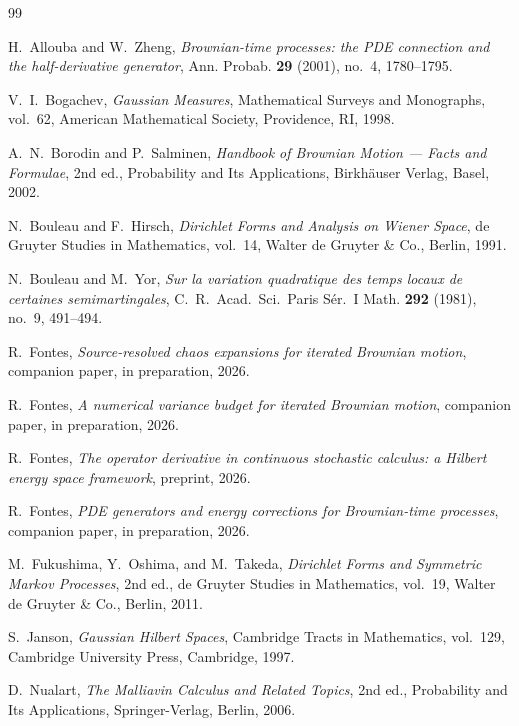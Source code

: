 \documentclass[11pt,reqno]{amsart}
\theoremstyle{plain}
\theoremstyle{definition}
\theoremstyle{remark}
\begin{document}
\begin{thebibliography}{99}

H.~Allouba and W.~Zheng,
\emph{Brownian-time processes: the PDE connection and the
half-derivative generator},
Ann. Probab. \textbf{29} (2001), no.~4, 1780--1795.

V.~I.~Bogachev,
\emph{Gaussian Measures},
Mathematical Surveys and Monographs, vol.~62,
American Mathematical Society, Providence, RI, 1998.

A.~N.~Borodin and P.~Salminen,
\emph{Handbook of Brownian Motion --- Facts and Formulae},
2nd ed., Probability and Its Applications,
Birkh\"auser Verlag, Basel, 2002.

N.~Bouleau and F.~Hirsch,
\emph{Dirichlet Forms and Analysis on Wiener Space},
de Gruyter Studies in Mathematics, vol.~14,
Walter de Gruyter \& Co., Berlin, 1991.

N.~Bouleau and M.~Yor,
\emph{Sur la variation quadratique des temps locaux de certaines
semimartingales},
C.~R.~Acad.~Sci.~Paris S\'er.~I Math. \textbf{292} (1981), no.~9,
491--494.

R.~Fontes,
\emph{Source-resolved chaos expansions for iterated Brownian motion},
companion paper, in preparation, 2026.

R.~Fontes,
\emph{A numerical variance budget for iterated Brownian motion},
companion paper, in preparation, 2026.

R.~Fontes,
\emph{The operator derivative in continuous stochastic calculus:
a Hilbert energy space framework},
preprint, 2026.

R.~Fontes,
\emph{PDE generators and energy corrections for Brownian-time processes},
companion paper, in preparation, 2026.

M.~Fukushima, Y.~Oshima, and M.~Takeda,
\emph{Dirichlet Forms and Symmetric Markov Processes},
2nd ed., de Gruyter Studies in Mathematics, vol.~19,
Walter de Gruyter \& Co., Berlin, 2011.

S.~Janson,
\emph{Gaussian Hilbert Spaces},
Cambridge Tracts in Mathematics, vol.~129,
Cambridge University Press, Cambridge, 1997.

D.~Nualart,
\emph{The Malliavin Calculus and Related Topics},
2nd ed., Probability and Its Applications,
Springer-Verlag, Berlin, 2006.


\end{thebibliography}
\end{document}
